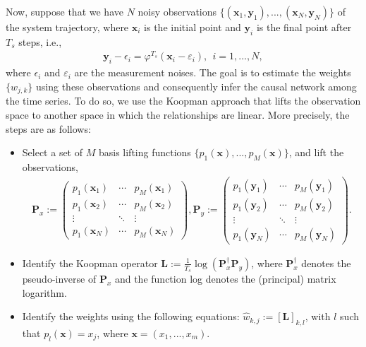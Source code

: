 Now, suppose that we have $N$ noisy observations $\{(\textbf{x}_1, \textbf{y}_1), ..., (\textbf{x}_N, \textbf{y}_N)\}$ of the system trajectory, where $\textbf{x}_i$ is the initial point and $\textbf{y}_i$ is the final point after $T_s$ steps, i.e., 
\begin{align*}
\textbf{y}_i - \epsilon_i = \varphi^{T_s}(\textbf{x}_i - \varepsilon_i), \ \  i=1,...,N,
\end{align*}
where $\epsilon_i$ and $\varepsilon_i$ are the measurement noises. 
The goal is to estimate the weights $\{w_{j,k}\}$ using these observations and consequently infer the causal network among the time series. To do so, we use the Koopman approach \cite{mauroy2019koopman} that lifts the observation space to another space in which the relationships are linear. 
More precisely, the steps are as follows:
\begin{itemize}
\item Select a set of $M$ basis lifting functions $\{p_1(\textbf{x}), ..., p_M(\textbf{x})\}$, and lift the observations,
\begin{align}
\textbf{P}_x:=\begin{pmatrix}
p_1(\textbf{x}_1) & \cdots & p_M(\textbf{x}_1)\\
p_1(\textbf{x}_2) & \cdots & p_M(\textbf{x}_2)\\
\vdots  &  \ddots & \vdots  \\
p_1(\textbf{x}_N) & \cdots & p_M(\textbf{x}_N)
\end{pmatrix}, 
\textbf{P}_y:=\begin{pmatrix}
p_1(\textbf{y}_1) & \cdots & p_M(\textbf{y}_1)\\
p_1(\textbf{y}_2) & \cdots & p_M(\textbf{y}_2)\\
\vdots  &  \ddots & \vdots  \\
p_1(\textbf{y}_N) & \cdots & p_M(\textbf{y}_N)
\end{pmatrix}\!.
\end{align}

\item Identify the Koopman operator $\textbf{L}:=\frac{1}{T_s}\log(\textbf{P}_x^{\dagger}\textbf{P}_y)$, where $\textbf{P}_x^{\dagger}$ denotes the pseudo-inverse of $\textbf{P}_x$ and the function log denotes the (principal) matrix logarithm.



\item Identify the weights using the following equations: $\widehat{w}_{k,j}:=[\textbf{L}]_{k,l}$, with $l$ such that $p_l(\textbf{x})=x_j$, where $\textbf{x}=(x_1,...,x_m)$.

\end{itemize}

